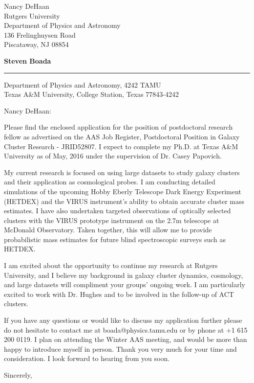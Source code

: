 \documentclass[11pt]{letter} %
\begin{document}
\signature{Steven Boada}           %
\longindentation=0pt               %
\let\raggedleft\raggedright        %
 
\begin{letter}{Nancy DeHaan\\
Rutgers University \\
Department of Physics and Astronomy \\
136 Frelinghuysen Road \\
Piscataway, NJ 08854}

\begin{flushleft}
{\huge\bf Steven Boada}
\end{flushleft}
\medskip\hrule height 1pt
\begin{flushright}
\hfill Department of Physics and Astronomy, 4242 TAMU \\
\hfill Texas A\&M University, College Station, Texas 77843-4242 
\end{flushright} 
\vfill %

\opening{Nancy DeHaan:} 
 
\noindent Please find the enclosed application for the position of postdoctoral research fellow as advertised on the AAS Job Register, 	
Postdoctoral Position in Galaxy Cluster Research - JRID52807. I expect to complete my Ph.D. at Texas A\&M University as of May, 2016 under the supervision of Dr. Casey Papovich. 

\noindent My current research is focused on using large datasets to study galaxy clusters and their application as cosmological probes. I am conducting detailed simulations of the upcoming Hobby Eberly Telescope Dark Energy Experiment (HETDEX) and the VIRUS instrument's ability to obtain accurate cluster mass estimates. I have also undertaken targeted observations of optically selected clusters with the VIRUS prototype instrument on the 2.7m telescope at McDonald Observatory. Taken together, this will allow me to provide probabilistic mass estimates for future blind spectroscopic surveys such as HETDEX.

\noindent I am excited about the opportunity to continue my research at Rutgers University, and I believe my background in galaxy cluster dynamics, cosmology, and large datasets will compliment your groups' ongoing work. I am particularly excited to work with Dr. Hughes and to be involved in the follow-up of ACT clusters.

\noindent If you have any questions or would like to discuss my application further please do not hesitate to contact me at boada@physics.tamu.edu or by phone at +1 615 200 0119. I plan on attending the Winter AAS meeting, and would be more than happy to introduce myself in person. Thank you very much for your time and consideration. I look forward to hearing from you soon.
 
\closing{Sincerely,} 
 

 
\end{letter}
\end{document}
